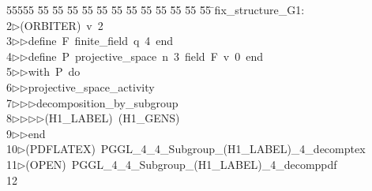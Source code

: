 %
%
\begin{tabbing}
55555 \= 55 \= 55 \= 55 \= 55 \= 55 \= 55 \= 55 \= 55 \= 55 \= 55 \= 55 \= 55 \= \>fix\_structure\_G1:\\[0pt]
2\>$\triangleright$\>(ORBITER)\ v\ 2\ \\[0pt]
3\>$\triangleright$\>$\triangleright$\>define\ F\ finite\_field\ q\ 4\ end\ \\[0pt]
4\>$\triangleright$\>$\triangleright$\>define\ P\ projective\_space\ n\ 3\ field\ F\ v\ 0\ end\ \\[0pt]
5\>$\triangleright$\>$\triangleright$\>with\ P\ do\ \\[0pt]
6\>$\triangleright$\>$\triangleright$\>projective\_space\_activity\ \\[0pt]
7\>$\triangleright$\>$\triangleright$\>$\triangleright$\>decomposition\_by\_subgroup\ \\[0pt]
8\>$\triangleright$\>$\triangleright$\>$\triangleright$\>$\triangleright$\>(H1\_LABEL)\ (H1\_GENS)\ \ \\[0pt]
9\>$\triangleright$\>$\triangleright$\>end\ \\[0pt]
10\>$\triangleright$\>(PDFLATEX)\ PGGL\_4\_4\_Subgroup\_(H1\_LABEL)\_4\_decomptex\\[0pt]
11\>$\triangleright$\>(OPEN)\ PGGL\_4\_4\_Subgroup\_(H1\_LABEL)\_4\_decomppdf\\[0pt]
12\>\end{tabbing}
